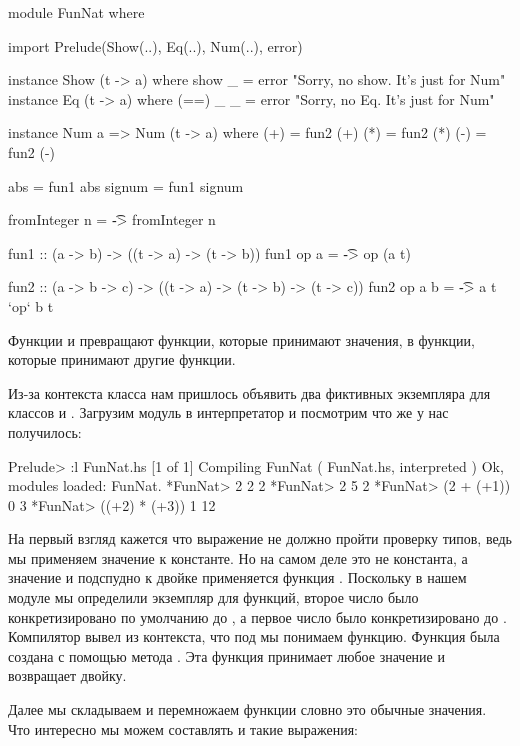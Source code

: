 \begin{code}
module FunNat where

import Prelude(Show(..), Eq(..), Num(..), error)

instance Show (t -> a) where
    show _ = error "Sorry, no show. It's just for Num"
instance Eq (t -> a) where
    (==) _ _ = error "Sorry, no Eq. It's just for Num"

instance Num a => Num (t -> a) where
    (+) = fun2 (+)
    (*) = fun2 (*)
    (-) = fun2 (-)

    abs      = fun1 abs
    signum   = fun1 signum

    fromInteger n = \t -> fromInteger n

fun1 :: (a -> b) -> ((t -> a) -> (t -> b))
fun1 op a = \t -> op (a t)

fun2 :: (a -> b -> c) -> ((t -> a) -> (t -> b) -> (t -> c))
fun2 op a b = \t -> a t `op` b t
\end{code}

Функции  и  превращают функции, которые
принимают значения, в функции, которые принимают другие
функции. 

Из-за контекста класса  нам пришлось объявить 
два фиктивных экземпляра для классов  и .
Загрузим модуль  в интерпретатор и 
посмотрим что же у нас получилось:

\begin{code}
Prelude> :l FunNat.hs
[1 of 1] Compiling FunNat           ( FunNat.hs, interpreted )
Ok, modules loaded: FunNat.
*FunNat> 2 2
2
*FunNat> 2 5
2
*FunNat> (2 + (+1)) 0 
3
*FunNat> ((+2) * (+3)) 1
12
\end{code}

На первый взгляд кажется что выражение  не должно
пройти проверку типов, ведь мы применяем значение к константе.
Но на самом деле  это не константа, а значение 
и подспудно к двойке применяется функция .
Поскольку в нашем модуле мы определили экземпляр  для
функций, второе число  было конкретизировано по умолчанию 
до , а первое число  было конкретизировано
до . Компилятор вывел из контекста,
что под  мы понимаем функцию. Функция была создана 
с помощью метода . Эта функция принимает любое 
значение и возвращает двойку.

Далее мы складываем и перемножаем функции словно это обычные значения.
Что интересно мы можем составлять и такие выражения:

